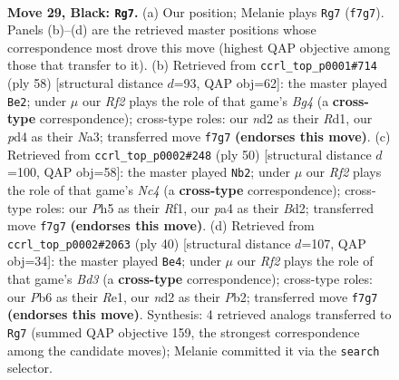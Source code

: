 \documentclass[11pt]{article}
\begin{document}
\clearpage

\begin{figure}[p]\centering
\begin{subfigure}{0.46\textwidth}\centering
\resizebox{\linewidth}{!}{%
\newchessgame
\chessboard[
  setfen={3rbbn1/p1k2r2/1p2p1p1/nP1pP1Pp/P2P1P2/6K1/3N4/RNB2B1R b - - 13 29},
  showmover=false,
  pgfstyle=straightmove, color=movearrow, markmove={f7-g7}
]}
\caption{}
\end{subfigure}\hfill
\begin{subfigure}{0.46\textwidth}\centering
\resizebox{\linewidth}{!}{%
\newchessgame
\chessboard[
  setfen={4r3/3r1k2/bpp1pp1p/p2n2pP/P2P2B1/N1P3P1/1P3P2/3RR1K1 w - - 2 30},
  showmover=false,
  pgfstyle=straightmove, color=movearrow, markmove={g4-e2}
]}
\caption{}
\end{subfigure}
\\[4pt]
\begin{subfigure}{0.46\textwidth}\centering
\resizebox{\linewidth}{!}{%
\newchessgame
\chessboard[
  setfen={3r1b2/1bk4r/pp6/2pnPp2/P1N2Ppp/2PP4/2NBK1PP/1R3R2 w - - 2 26},
  showmover=false,
  pgfstyle=straightmove, color=movearrow, markmove={c4-b2}
]}
\caption{}
\end{subfigure}\hfill
\begin{subfigure}{0.46\textwidth}\centering
\resizebox{\linewidth}{!}{%
\newchessgame
\chessboard[
  setfen={b3k2r/2rp1pp1/p3p3/N2nP2p/Pp3P2/3B4/1PP3PP/1K1RR3 w k - 3 21},
  showmover=false,
  pgfstyle=straightmove, color=movearrow, markmove={d3-e4}
]}
\caption{}
\end{subfigure}
\caption{\textbf{Move 29, Black: \texttt{Rg7}.} (a) Our position; Melanie plays \texttt{Rg7} (\texttt{f7g7}). Panels (b)--(d) are the retrieved master positions whose correspondence most drove this move (highest QAP objective among those that transfer to it). (b) Retrieved from \texttt{ccrl\_top\_p0001\#714} (ply 58) [structural distance $d$=93, QAP obj=62]: the master played \texttt{Be2}; under $\mu$ our \emph{Rf2} plays the role of that game's \emph{Bg4} (a \textbf{cross-type} correspondence); cross-type roles: our \emph{n}d2 as their \emph{R}d1, our \emph{p}d4 as their \emph{N}a3; transferred move \texttt{f7g7} \textbf{(endorses this move)}. (c) Retrieved from \texttt{ccrl\_top\_p0002\#248} (ply 50) [structural distance $d$=100, QAP obj=58]: the master played \texttt{Nb2}; under $\mu$ our \emph{Rf2} plays the role of that game's \emph{Nc4} (a \textbf{cross-type} correspondence); cross-type roles: our \emph{P}h5 as their \emph{R}f1, our \emph{p}a4 as their \emph{B}d2; transferred move \texttt{f7g7} \textbf{(endorses this move)}. (d) Retrieved from \texttt{ccrl\_top\_p0002\#2063} (ply 40) [structural distance $d$=107, QAP obj=34]: the master played \texttt{Be4}; under $\mu$ our \emph{Rf2} plays the role of that game's \emph{Bd3} (a \textbf{cross-type} correspondence); cross-type roles: our \emph{P}b6 as their \emph{R}e1, our \emph{n}d2 as their \emph{P}b2; transferred move \texttt{f7g7} \textbf{(endorses this move)}. Synthesis: 4 retrieved analogs transferred to \texttt{Rg7} (summed QAP objective 159, the strongest correspondence among the candidate moves); Melanie committed it via the \texttt{search} selector.}
\label{fig:thought-m57}
\end{figure}
\end{document}
